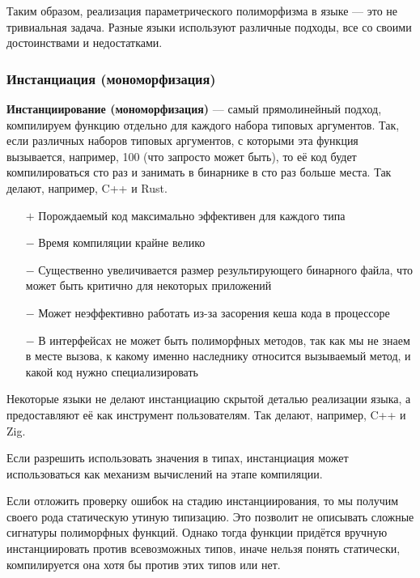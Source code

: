 \documentclass[12pt]{article}
\newcommand{\vocab}[1]{\textbf{#1}} %
\newcommand{\positive}{$+$} %
\newcommand{\negative}{{\color{red} $-$}} %
\begin{document}
    Таким образом, реализация параметрического полиморфизма в языке --- это не тривиальная задача.
    Разные языки используют различные подходы, все со своими достоинствами и недостатками.

    \subsubsection{Инстанциация (мономорфизация)}

    \vocab{Инстанциирование (мономорфизация)} --- самый прямолинейный подход, компилируем функцию отдельно для каждого набора типовых аргументов.
    Так, если различных наборов типовых аргументов, с которыми эта функция вызывается, например, 100 (что запросто может быть), то её код будет компилироваться сто раз и занимать в бинарнике в сто раз больше места.
    Так делают, например, C++ и Rust.

    \begin{itemize}
        \item[\positive] Порождаемый код максимально эффективен для каждого типа
        \item[\negative] Время компиляции крайне велико
        \item[\negative] Существенно увеличивается размер результирующего бинарного файла, что может быть критично для некоторых приложений
        \item[\negative] Может неэффективно работать из-за засорения кеша кода в процессоре
        \item[\negative] В интерфейсах не может быть полиморфных методов, так как мы не знаем в месте вызова, к какому именно наследнику относится вызываемый метод, и какой код нужно специализировать
    \end{itemize}

    Некоторые языки не делают инстанциацию скрытой деталью реализации языка, а предоставляют её как инструмент пользователям.
    Так делают, например, C++ и Zig.

    Если разрешить использовать значения в типах, инстанциация может использоваться как механизм вычислений на этапе компиляции.

    Если отложить проверку ошибок на стадию инстанциирования, то мы получим своего рода статическую утиную типизацию.
    Это позволит не описывать сложные сигнатуры полиморфных функций.
    Однако тогда функции придётся вручную инстанциировать против всевозможных типов, иначе нельзя понять статически, компилируется она хотя бы против этих типов или нет.
\end{document}
